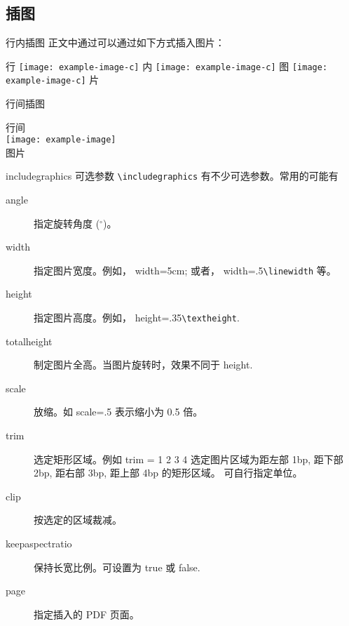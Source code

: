 \documentclass[]{ctexbeamer}
\begin{document}
\section{}
% 
\subsection{插图}
\begin{frame}{行内插图}
正文中通过可以通过如下方式插入图片：
\begin{vertlst}
行 \texttt{[image: example-image-c]}
内 \texttt{[image: example-image-c]}
图 \texttt{[image: example-image-c]}
片 
\end{vertlst}
\end{frame}

\begin{frame}[fragile]{行间插图}
\begin{vertlst}
行间 \\ \texttt{[image: example-image]} \\ 图片
\end{vertlst}
\end{frame}


\begin{frame}[fragile]{includegraphics 可选参数}
\verb+\includegraphics+ 有不少可选参数。常用的可能有
\begin{description}
  \item[angle] 指定旋转角度 ($^\circ$)。
  \item[width] 指定图片宽度。例如， width=5cm; 或者， width=.5\verb+\linewidth+ 等。
  \item[height] 指定图片高度。例如， height=.35\verb+\textheight+.
  \item[totalheight] 制定图片全高。当图片旋转时，效果不同于 height.
  \item[scale] 放缩。如 scale=.5 表示缩小为 0.5 倍。 
  \item[trim] 选定矩形区域。例如 trim = 1 2 3 4 选定图片区域为距左部 1bp, 距下部 2bp, 距右部 3bp, 距上部 4bp 的矩形区域。 可自行指定单位。
  \item[clip] 按选定的区域裁减。
  \item[keepaspectratio] 保持长宽比例。可设置为 true 或 false. 
  \item[page] 指定插入的 PDF 页面。 
\end{description}
\end{frame}
\end{document}
